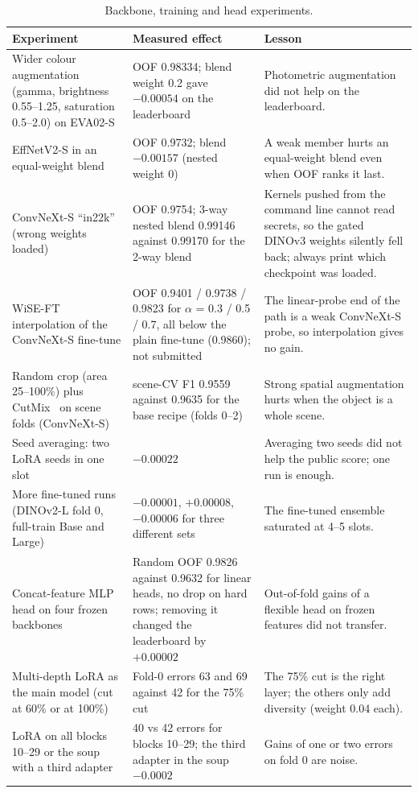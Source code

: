 \documentclass[../main.tex]{subfiles}
\begin{document}
\begin{table}[H]\centering\footnotesize
\begin{tabular}{@{}L{.22\linewidth}L{.36\linewidth}L{.34\linewidth}@{}}
\toprule
\textbf{Experiment} & \textbf{Measured effect} & \textbf{Lesson} \\
\midrule
Wider colour augmentation (gamma, brightness 0.55--1.25, saturation 0.5--2.0) on EVA02-S & OOF 0.98334; blend weight 0.2 gave $-0.00054$ on the leaderboard & Photometric augmentation did not help on the leaderboard. \\
EffNetV2-S in an equal-weight blend & OOF 0.9732; blend $-0.00157$ (nested weight 0) & A weak member hurts an equal-weight blend even when OOF ranks it last. \\
ConvNeXt-S ``in22k'' (wrong weights loaded) & OOF 0.9754; 3-way nested blend 0.99146 against 0.99170 for the 2-way blend & Kernels pushed from the command line cannot read secrets, so the gated DINOv3 weights silently fell back; always print which checkpoint was loaded. \\
WiSE-FT~\citep{wiseft} interpolation of the ConvNeXt-S fine-tune & OOF 0.9401 / 0.9738 / 0.9823 for $\alpha$ = 0.3 / 0.5 / 0.7, all below the plain fine-tune (0.9860); not submitted & The linear-probe end of the path is a weak ConvNeXt-S probe, so interpolation gives no gain. \\
Random crop (area 25--100\%) plus CutMix~\citep{cutmix} on scene folds (ConvNeXt-S) & scene-CV F1 0.9559 against 0.9635 for the base recipe (folds 0--2) & Strong spatial augmentation hurts when the object is a whole scene. \\
Seed averaging: two LoRA seeds in one slot & $-0.00022$ & Averaging two seeds did not help the public score; one run is enough. \\
More fine-tuned runs (DINOv2-L fold 0, full-train Base and Large) & $-0.00001$, $+0.00008$, $-0.00006$ for three different sets & The fine-tuned ensemble saturated at 4--5 slots. \\
Concat-feature MLP head on four frozen backbones & Random OOF 0.9826 against 0.9632 for linear heads, no drop on hard rows; removing it changed the leaderboard by $+0.00002$ & Out-of-fold gains of a flexible head on frozen features did not transfer. \\
Multi-depth LoRA as the main model (cut at 60\% or at 100\%) & Fold-0 errors 63 and 69 against 42 for the 75\% cut & The 75\% cut is the right layer; the others only add diversity (weight 0.04 each). \\
LoRA on all blocks 10--29 or the soup with a third adapter & 40 vs 42 errors for blocks 10--29; the third adapter in the soup $-0.0002$ & Gains of one or two errors on fold 0 are noise. \\
\bottomrule
\end{tabular}
\caption{Backbone, training and head experiments.}\label{tab:t4-fail-a}
\end{table}
\end{document}
